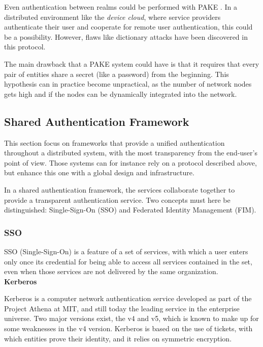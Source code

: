 Even authentication between realms could be performed with PAKE \cite{byun2002password}. In a distributed environment like the \emph{device cloud}, where service providers authenticate their user and cooperate for remote user authentication, this could be a possibility. However, flaws like dictionary attacks have been discovered \cite{Wang2004} in this protocol.

The main drawback that a PAKE system could have is that it requires that every pair of entities share a secret (like a password) from the beginning. This hypothesis can in practice become unpractical, as the number of network nodes gets high and if the nodes can be dynamically integrated into the network.


\subsection{Shared Authentication Framework}
This section focus on frameworks that provide a unified authentication throughout a distributed system, with the most transparency from the end-user's point of view. Those systems can for instance rely on a protocol described above, but enhance this one with a global design and infrastructure. 

In a shared authentication framework, the services collaborate together to provide a transparent authentication service. Two concepts must here be distinguished: Single-Sign-On (SSO) and Federated Identity Management (FIM).

\subsubsection{SSO}
\label{sec:02_SSO}
SSO (Single-Sign-On) is a feature of a set of services, with which a user enters only once its credential for being able to access all services contained in the set, even when those services are not delivered by the same organization.
\\
 
\quad \tabitem	\textbf{Kerberos}

\label{sec:02_Kerberos}
Kerberos\cite{Sundareswaran} is a computer network authentication service developed as part of the Project Athena at MIT, and still today the leading service in the enterprise universe. Two major versions exist, the v4 and v5, which is known to make up for some weaknesses in the v4 version. Kerberos is based on the use of tickets, with which entities prove their identity, and it relies on symmetric encryption.


